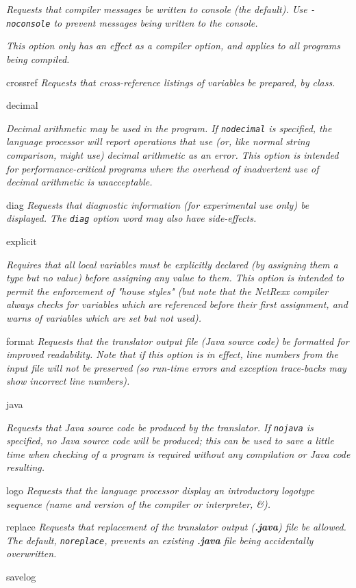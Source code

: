 \begin{description}
\emph{Requests that compiler messages be written to console (the default).
Use \texttt{-noconsole} to prevent messages being written to the
console.}
 
\emph{This option only has an effect as a compiler option, and applies to all
programs being compiled.}
\item{crossref}
\emph{Requests that cross-reference listings of variables be prepared,
by class.}
\item{decimal}

\emph{Decimal arithmetic may be used in the program.  If \texttt{nodecimal} is
specified, the language processor will report operations that use (or,
like normal string comparison, might use) decimal arithmetic as an
error.  This option is intended for performance-critical programs where
the overhead of inadvertent use of decimal arithmetic is
unacceptable.}
\item{diag}
\emph{Requests that diagnostic information (for experimental use only)
be displayed.
The \texttt{diag} option word may also have side-effects.}
\item{explicit}

\emph{Requires that all local variables must be explicitly declared (by
assigning them a type but no value) before assigning any value to them.
This option is intended to permit the enforcement of "house styles"
(but note that the NetRexx compiler always checks for variables which
are referenced before their first assignment, and warns of variables
which are set but not used).}
\item{format}
\emph{Requests that the translator output file (Java source code) be
formatted for improved readability.
Note that if this option is in effect, line numbers from the input file
will not be preserved (so run-time errors and exception trace-backs may
show incorrect line numbers).}
\item{java}

\emph{Requests that Java source code be produced by the translator.
If \texttt{nojava} is specified, no Java source code will be produced;
this can be used to save a little time when checking of a program is
required without any compilation or Java code resulting.}
\item{logo}
\emph{Requests that the language processor display an introductory
logotype sequence (name and version of the compiler or interpreter,
\&).}
\item{replace}
\emph{Requests that replacement of the translator output
(\textbf{.java}) file be allowed.
The default, \texttt{noreplace}, prevents an existing \textbf{.java}
file being accidentally overwritten.}
\item{savelog}


\end{description}

